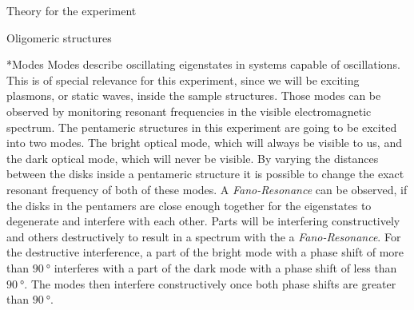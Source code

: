 \documentclass[pdftex, a4paper,11pt, twoside, UKenglish]{report}
\begin{document}
\begin{chapter}{Theory for the experiment}
\begin{section}{Oligomeric structures}
      
      
      \begin{subsection}*{Modes}
        Modes describe oscillating eigenstates in systems capable of
        oscillations. This is of special relevance for this experiment, since we
        will be exciting plasmons, or static waves, inside the sample
        structures. Those modes can be observed by monitoring resonant
        frequencies in the visible electromagnetic spectrum.
        The pentameric structures in this experiment are going to be excited
        into two modes. The bright optical mode, which will always be visible
        to us, and the dark optical mode, which will never be visible.
        By varying the distances between the disks inside a pentameric
        structure it is possible to change the exact resonant frequency of both
        of these modes.
        A \textit{Fano-Resonance} can be observed, if the disks in the pentamers
        are close enough together for the eigenstates to degenerate and
        interfere with each other. Parts will be interfering constructively
        and others destructively to result in a spectrum with the a
        \textit{Fano-Resonance}.
        For the destructive interference, a part of the bright mode with a
        phase shift of more than $\SI{90}{\degree}$ interferes with a part of
        the dark mode with a phase shift of less than $\SI{90}{\degree}$.
        The modes then interfere constructively once both phase shifts are
        greater than $\SI{90}{\degree}$.
      \end{subsection}
      
    \end{section}
    
  \end{chapter}
         
         
         
\end{document}
